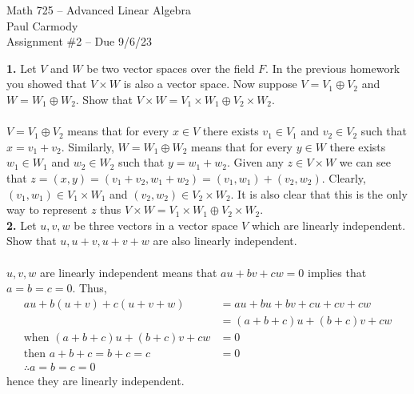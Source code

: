 \documentclass[11pt]{amsart}
\theoremstyle{definition}  %
\begin{document}
\begin{center}
\Large{Math 725 -- Advanced Linear Algebra}\\
\large{Paul Carmody}\\
Assignment \#2 -- Due 9/6/23
\end{center}


\vskip 0.25cm
\noindent
{\bf 1.} Let $V$ and $W$ be two vector spaces over the field $F$. In the previous homework you showed  that $V \times W$ is also 
a vector space. 
Now suppose $V = V_1 \oplus V_2$ and $W = W_1 \oplus W_2$. Show that $V \times W = V_1 \times W_1 \oplus V_2 \times W_2$. \\
\\
$V = V_1 \oplus V_2$ means that for every $x\in V$ there exists $v_1 \in V_1$ and $v_2 \in V_2$ such that $x=v_1+v_2$.  Similarly, $W= W_1 \oplus W_2$ means that for every $y\in W$ there exists $w_1 \in W_1$ and $w_2 \in W_2$ such that $y=w_1+w_2$.  Given any $z \in V \times W$ we can see that $z = (x,y)=(v_1+v_2,w_1+w_2)=(v_1,w_1)+(v_2,w_2)$.  Clearly, $(v_1,w_1) \in V_1 \times W_1$ and $(v_2,w_2) \in V_2 \times W_2$.  It is also clear that this is the only way to represent $z$ thus $V \times W = V_1 \times W_1 \oplus V_2 \times W_2$.
\\

\vskip 0.1cm
\noindent 
{\bf 2.} Let $u, v, w$ be three vectors in a vector space $V$ which are linearly independent. Show that $u, u+v, u+v+w$ are also 
linearly independent. \\
\\
$u,v,w$ are linearly independent means that $au+bv+cw=0$ implies that $a=b=c=0$.  Thus, 
\begin{align*}
	au+b(u+v)+c(u+v+w) &= au+bu+bv+cu+cv+cw \\
	&= (a+b+c)u+(b+c)v + cw \\
	\text{when } (a+b+c)u+(b+c)v + cw &= 0 \\
	\text{then } a+b+c=b+c=c&=0 \\
	\therefore a=b=c=0
\end{align*}hence they are linearly independent.\\
\end{document}

